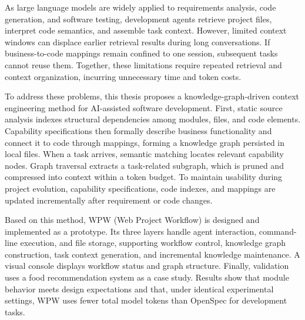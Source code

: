 \begin{EnglishAbstract}
As large language models are widely applied to requirements analysis, code generation, and software testing, development agents retrieve project files, interpret code semantics, and assemble task context. However, limited context windows can displace earlier retrieval results during long conversations. If business-to-code mappings remain confined to one session, subsequent tasks cannot reuse them. Together, these limitations require repeated retrieval and context organization, incurring unnecessary time and token costs.

To address these problems, this thesis proposes a knowledge-graph-driven context engineering method for AI-assisted software development. First, static source analysis indexes structural dependencies among modules, files, and code elements. Capability specifications then formally describe business functionality and connect it to code through mappings, forming a knowledge graph persisted in local files. When a task arrives, semantic matching locates relevant capability nodes. Graph traversal extracts a task-related subgraph, which is pruned and compressed into context within a token budget. To maintain usability during project evolution, capability specifications, code indexes, and mappings are updated incrementally after requirement or code changes.

Based on this method, WPW (Web Project Workflow) is designed and implemented as a prototype. Its three layers handle agent interaction, command-line execution, and file storage, supporting workflow control, knowledge graph construction, task context generation, and incremental knowledge maintenance. A visual console displays workflow status and graph structure. Finally, validation uses a food recommendation system as a case study. Results show that module behavior meets design expectations and that, under identical experimental settings, WPW uses fewer total model tokens than OpenSpec for development tasks.

\end{EnglishAbstract}
